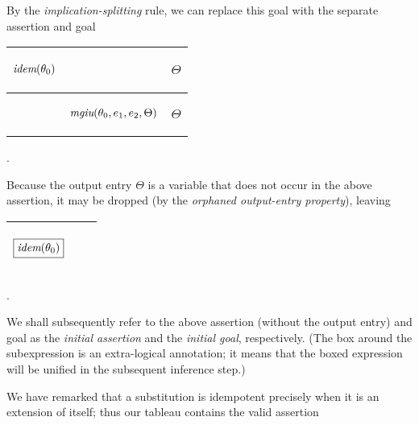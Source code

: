 \documentclass[runningheads]{llncs}
\DeclareMathOperator{\idem}{\emph{idem}}
\DeclareMathOperator{\mgiu}{\emph{mgiu}}
\begin{document}
 By the \emph{implication-splitting} rule, we can replace this goal with the separate assertion and goal
\begin{center}
\begin{tabularx}{1.0\textwidth} { 
  | >{\raggedright\arraybackslash}X 
  | >{\raggedright\arraybackslash}X 
  || >{\raggedright\arraybackslash}X | }
 \hline 
 \vspace{-.3cm}\begin{center}$\idem(\thet{0})$\end{center} &  & \vspace{-.3cm}\begin{center}$\Theta$ \end{center} \\
\hline
  & \vspace{-.3cm}\begin{center}$ {\mgiu}(\thet{0}, \e{1}, \e{2} , \Theta)$  \end{center}  & \vspace{-.3cm}\begin{center}$\Theta$\end{center} \\
\hline
\end{tabularx}.
\end{center}
Because the output entry $\Theta$ is a variable that does not occur in the above assertion, it may be dropped (by the \emph{orphaned output-entry property}), leaving

\begin{center}
\begin{tabularx}{1.0\textwidth} { 
  | >{\raggedright\arraybackslash}X 
  | >{\raggedright\arraybackslash}X 
  || >{\raggedright\arraybackslash}X | }
 \hline 
 \vspace{-.3cm}\begin{center}$\boxed{\idem(\thet{0})}$\end{center} &  & \\
\hline
\end{tabularx}.
\end{center}
We shall subsequently refer to the above assertion (without the output entry) and goal as the  \emph{initial assertion} and the  \emph{initial goal}, respectively. (The box around the subexpression is an extra-logical annotation; it means that the boxed expression will be unified in the subsequent inference step.)

We have remarked that a substitution is idempotent precisely when it is an extension of itself; thus our tableau contains the valid assertion
\end{document}
